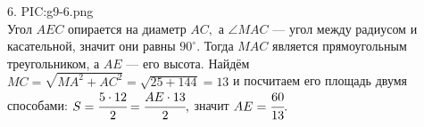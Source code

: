 6. {{PIC:g9-6.png}}\\
Угол $AEC$ опирается на диаметр $AC,$ а $\angle MAC$ --- угол между радиусом и касательной, значит они равны $90^\circ.$ Тогда $MAC$ является прямоугольным треугольником, а $AE$ --- его высота. Найдём $MC=\sqrt{MA^2+AC^2}=\sqrt{25+144}=13$ и посчитаем его площадь двумя способами: $S=\cfrac{5\cdot12}{2}=\cfrac{AE\cdot13}{2},$ значит $AE=\cfrac{60}{13}.$\\

